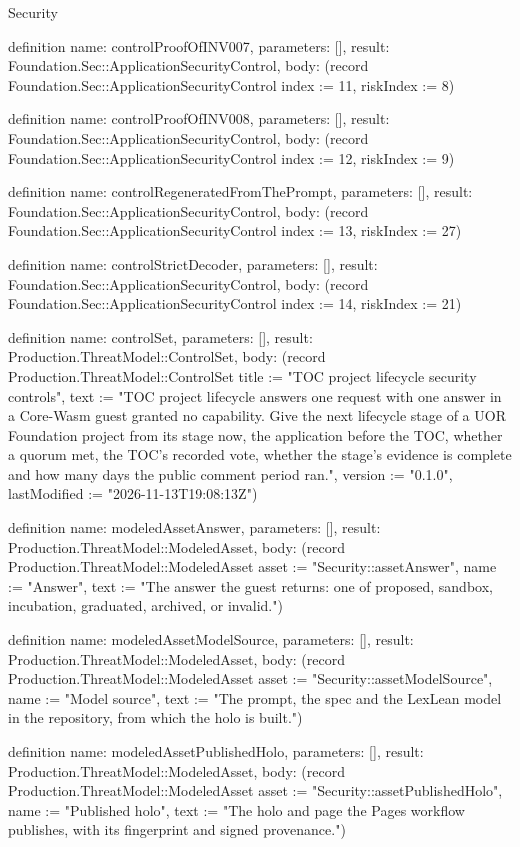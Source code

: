 \begin{lexlean}{Security}
\begin{semanticmodule}
definition{
  name: controlProofOfINV007,
  parameters: [],
  result: Foundation.Sec::ApplicationSecurityControl,
  body: (record Foundation.Sec::ApplicationSecurityControl {index := 11, riskIndex := 8})
}

definition{
  name: controlProofOfINV008,
  parameters: [],
  result: Foundation.Sec::ApplicationSecurityControl,
  body: (record Foundation.Sec::ApplicationSecurityControl {index := 12, riskIndex := 9})
}

definition{
  name: controlRegeneratedFromThePrompt,
  parameters: [],
  result: Foundation.Sec::ApplicationSecurityControl,
  body: (record Foundation.Sec::ApplicationSecurityControl {index := 13, riskIndex := 27})
}

definition{
  name: controlStrictDecoder,
  parameters: [],
  result: Foundation.Sec::ApplicationSecurityControl,
  body: (record Foundation.Sec::ApplicationSecurityControl {index := 14, riskIndex := 21})
}

definition{
  name: controlSet,
  parameters: [],
  result: Production.ThreatModel::ControlSet,
  body: (record Production.ThreatModel::ControlSet {title := "TOC project lifecycle security controls", text := "TOC project lifecycle answers one request with one answer in a Core-Wasm guest granted no capability. Give the next lifecycle stage of a UOR Foundation project from its stage now, the application before the TOC, whether a quorum met, the TOC's recorded vote, whether the stage's evidence is complete and how many days the public comment period ran.", version := "0.1.0", lastModified := "2026-11-13T19:08:13Z"})
}

definition{
  name: modeledAssetAnswer,
  parameters: [],
  result: Production.ThreatModel::ModeledAsset,
  body: (record Production.ThreatModel::ModeledAsset {asset := "Security::assetAnswer", name := "Answer", text := "The answer the guest returns: one of proposed, sandbox, incubation, graduated, archived, or invalid."})
}

definition{
  name: modeledAssetModelSource,
  parameters: [],
  result: Production.ThreatModel::ModeledAsset,
  body: (record Production.ThreatModel::ModeledAsset {asset := "Security::assetModelSource", name := "Model source", text := "The prompt, the spec and the LexLean model in the repository, from which the holo is built."})
}

definition{
  name: modeledAssetPublishedHolo,
  parameters: [],
  result: Production.ThreatModel::ModeledAsset,
  body: (record Production.ThreatModel::ModeledAsset {asset := "Security::assetPublishedHolo", name := "Published holo", text := "The holo and page the Pages workflow publishes, with its fingerprint and signed provenance."})
}


\end{semanticmodule}
\end{lexlean}
